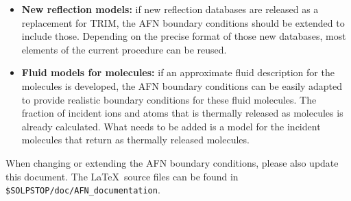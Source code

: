 \begin{itemize}
    \item \textbf{New reflection models:} if new reflection databases are released as a replacement for TRIM, the AFN boundary conditions should be extended to include those. Depending on the precise format of those new databases, most elements of the current procedure can be reused.
    \item \textbf{Fluid models for molecules:} if an approximate fluid description for the molecules is developed, the AFN boundary conditions can be easily adapted to provide realistic boundary conditions for these fluid molecules. The fraction of incident ions and atoms that is thermally released as molecules is already calculated. What needs to be added is a model for the incident molecules that return as thermally released molecules.
\end{itemize}

\noindent When changing or extending the AFN boundary conditions, please also update this document. The \LaTeX~source files can be found in {\tt \$SOLPSTOP/doc/AFN\_documentation}.
